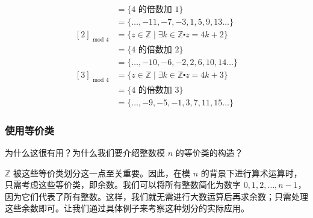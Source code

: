 \begin{itemize}
\begin{align*}
            &=  \{4 \text{\ 的倍数加\ } 1\}\\
            &= \{\dots, -11, -7, -3, 1, 5, 9, 13 \dots \}\\
            [2]_{\text{\ mod\ } 4} &= \{z \in \mathbb{Z} \mid \exists k \in \mathbb{Z} \centerdot z = 4k+2\}\\ 
            &=  \{4 \text{\ 的倍数加\ } 2\}\\
            &= \{\dots, -10, -6, -2, 2, 6, 10, 14 \dots \}\\
            [3]_{\text{\ mod\ } 4} &= \{z \in \mathbb{Z} \mid \exists k \in \mathbb{Z} \centerdot z = 4k+3\}\\ 
            &=  \{4 \text{\ 的倍数加\ } 3\}\\
            &= \{\dots, -9, -5, -1, 3, 7, 11, 15 \dots \}
        \end{align*}
\end{itemize}

\subsubsection*{使用等价类}

为什么这很有用？为什么我们要介绍整数模 $n$ 的等价类的构造？

$\mathbb{Z}$ 被这些等价类划分这一点至关重要。因此，在模 $n$ 的背景下进行算术运算时，只需考虑这些等价类，即余数。我们可以将所有整数简化为数字 $0, 1, 2, \dots, n-1$，因为它们代表了所有整数。这样，我们就无需进行大数运算后再求余数；只需处理这些余数即可。让我们通过具体例子来考察这种划分的实际应用。


